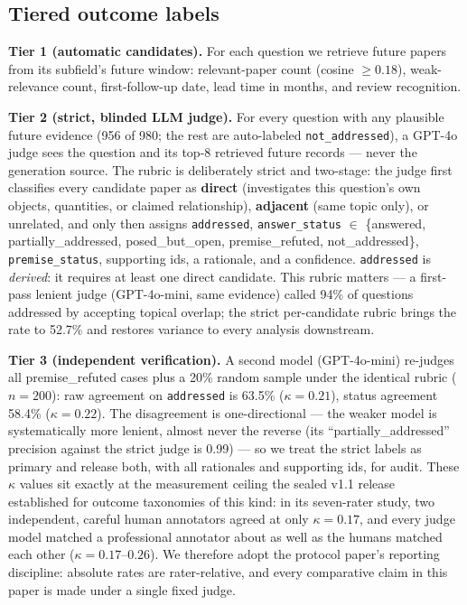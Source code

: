\documentclass[11pt]{article}
\newcommand{\addressedrate}{52.7\%}
\begin{document}
\subsection{Tiered outcome labels}

\textbf{Tier 1 (automatic candidates).} For each question we retrieve
future papers from its subfield's future window: relevant-paper count
(cosine $\geq 0.18$), weak-relevance count, first-follow-up date, lead
time in months, and review recognition.

\textbf{Tier 2 (strict, blinded LLM judge).} For every question with any
plausible future evidence (956 of 980; the rest are auto-labeled
\texttt{not\_addressed}), a GPT-4o judge sees the question and its top-8
retrieved future records --- never the generation source. The rubric is
deliberately strict and two-stage: the judge first classifies every
candidate paper as \textbf{direct} (investigates this question's own
objects, quantities, or claimed relationship), \textbf{adjacent} (same
topic only), or unrelated, and only then assigns \texttt{addressed},
\texttt{answer\_status} $\in$ \{answered, partially\_addressed,
posed\_but\_open, premise\_refuted, not\_addressed\},
\texttt{premise\_status}, supporting ids, a rationale, and a confidence.
\texttt{addressed} is \emph{derived}: it requires at least one direct
candidate. This rubric matters --- a first-pass lenient judge
(GPT-4o-mini, same evidence) called 94\% of questions addressed by
accepting topical overlap; the strict per-candidate rubric brings the
rate to \addressedrate{} and restores variance to every analysis
downstream.

\textbf{Tier 3 (independent verification).} A second model (GPT-4o-mini)
re-judges all premise\_refuted cases plus a 20\% random sample under the
identical rubric ($n=200$): raw agreement on \texttt{addressed} is 63.5\%
($\kappa = 0.21$), status agreement 58.4\% ($\kappa = 0.22$). The
disagreement is one-directional --- the weaker model is systematically
more lenient, almost never the reverse (its ``partially\_addressed''
precision against the strict judge is 0.99) --- so we treat the strict
labels as primary and release both, with all rationales and supporting
ids, for audit. These $\kappa$ values sit exactly at the measurement
ceiling the sealed v1.1 release~\cite{paper2} established for outcome taxonomies of this kind:
in its seven-rater study, two independent, careful human annotators
agreed at only $\kappa=0.17$, and every judge model matched a
professional annotator about as well as the humans matched each other
($\kappa=0.17$--$0.26$). We therefore adopt the protocol paper's reporting
discipline: absolute rates are rater-relative, and every comparative
claim in this paper is made under a single fixed judge.
\end{document}
